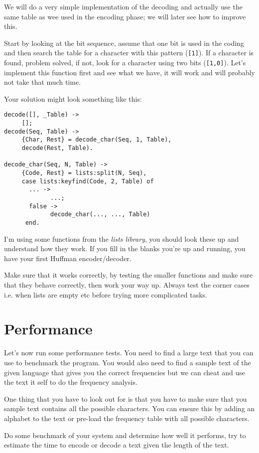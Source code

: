 \documentclass[a4paper,11pt]{article}
\begin{document}
We will do a very simple implementation of the decoding and actually
use the same table as wee used in the encoding phase; we will later see
how to improve this. 

Start by looking at the bit sequence, assume that one bit is used in the coding and then
search the table for a character with this pattern ({\tt [1]}). If
a character is found, problem solved, if not, look for a character
using two bits ({\tt [1,0]}). Let's implement this function first
and see what we have, it will work and will probably not take that much time.

Your solution might look something like this:

\begin{verbatim}
decode([], _Table) ->
     [];
decode(Seq, Table) ->
     {Char, Rest} = decode_char(Seq, 1, Table),
     decode(Rest, Table).

decode_char(Seq, N, Table) ->
     {Code, Rest} = lists:split(N, Seq),
     case lists:keyfind(Code, 2, Table) of
       ... ->
             ...;
       false ->
             decode_char(..., ..., Table)
      end.
\end{verbatim}

I'm using some functions from the {\em lists library}, you should look
these up and understand how they work. If you fill in the blanks
you're up and running, you have your first Huffman encoder/decoder.

Make sure that it works correctly, by testing the smaller functions
and make sure that they behave correctly, then work your way
up. Always test the corner cases i.e. when lists are empty etc before
trying more complicated tasks.

\section{Performance}

Let's now run some performance tests. You need to find a large text
that you can use to benchmark the program. You would also need to find
a sample text of the given language that gives you the correct
frequencies but we can cheat and use the text it self to do the
frequency analysis. 

One thing that you have to look out for is that you have to make sure
that you sample text contains all the possible characters. You can
ensure this by adding an alphabet to the text or pre-load the
frequency table with all possible characters.

Do some benchmark of your system and determine how well it
performs, try to estimate the time to encode or decode a text given
the length of the text. 
\end{document}
